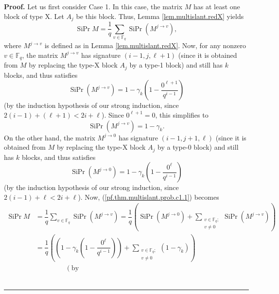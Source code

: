 \documentclass[numbers=enddot,12pt,final,onecolumn,notitlepage]{scrartcl}%
\theoremstyle{definition}
\newenvironment{proof}[1][Proof]{\noindent\textbf{#1.} }{\ \rule{0.5em}{0.5em}}
\let\sumnonlimits\sum
\renewcommand{\sum}{\sumnonlimits\limits}
\newcommand{\Fq}{\mathbb{F}_q}
\theoremstyle{plainsl}
\begin{document}
\begin{proof}
Let us first consider Case 1. In this case, the matrix $M$ has at least one
block of type X. Let $A_{j}$ be this block. Thus, Lemma
\ref{lem.multislant.redX} yields%
\begin{equation}
\operatorname*{SiPr}M=\dfrac{1}{q}\sum_{v\in\Fq}%
\operatorname*{SiPr}\left(  M^{j\rightarrow v}\right)  ,
\label{pf.thm.multislant.prob.c1.1}%
\end{equation}
where $M^{j\rightarrow v}$ is defined as in Lemma \ref{lem.multislant.redX}.
Now, for any nonzero $v\in\Fq$, the matrix $M^{j\rightarrow v}$ has
signature $\left(  i-1,j,\ell+1\right)  $ (since it is obtained from $M$ by
replacing the type-X block $A_{j}$ by a type-1 block) and still has $k$
blocks, and thus satisfies%
\[
\operatorname*{SiPr}\left(  M^{j\rightarrow v}\right)  =1-\gamma_{k}\left(
1-\dfrac{0^{\ell+1}}{q^{i-1}}\right)
\]
(by the induction hypothesis of our strong induction, since $2\left(
i-1\right)  +\left(  \ell+1\right)  <2i+\ell$). Since $0^{\ell+1}=0$, this
simplifies to%
\begin{equation}
\operatorname*{SiPr}\left(  M^{j\rightarrow v}\right)  =1-\gamma_{k}.
\label{pf.thm.multislant.prob.c1.2}%
\end{equation}
On the other hand, the matrix $M^{j\rightarrow0}$ has signature $\left(
i-1,j+1,\ell\right)  $ (since it is obtained from $M$ by replacing the type-X
block $A_{j}$ by a type-0 block) and still has $k$ blocks, and thus satisfies%
\begin{equation}
\operatorname*{SiPr}\left(  M^{j\rightarrow0}\right)  =1-\gamma_{k}\left(
1-\dfrac{0^{\ell}}{q^{i-1}}\right)  \label{pf.thm.multislant.prob.c1.3}%
\end{equation}
(by the induction hypothesis of our strong induction, since $2\left(
i-1\right)  +\ell<2i+\ell$). Now, (\ref{pf.thm.multislant.prob.c1.1}) becomes%
\begin{align*}
\operatorname*{SiPr}M  &  =\dfrac{1}{q}\sum_{v\in\Fq}%
\operatorname*{SiPr}\left(  M^{j\rightarrow v}\right)  =\dfrac{1}{q}\left(
\operatorname*{SiPr}\left(  M^{j\rightarrow0}\right)  +\sum_{\substack{v\in
\Fq;\\v\neq0}}\operatorname*{SiPr}\left(  M^{j\rightarrow
v}\right)  \right) \\
&  =\dfrac{1}{q}\left(  \left(  1-\gamma_{k}\left(  1-\dfrac{0^{\ell}}%
{q^{i-1}}\right)  \right)  +\sum_{\substack{v\in\Fq;\\v\neq
0}}\left(  1-\gamma_{k}\right)  \right) \\
&  \ \ \ \ \ \ \ \ \ \ \ \ \ \ \ \ \ \ \ \ \left(  \text{by
}
\end{align*}
\end{proof}
\end{document}

